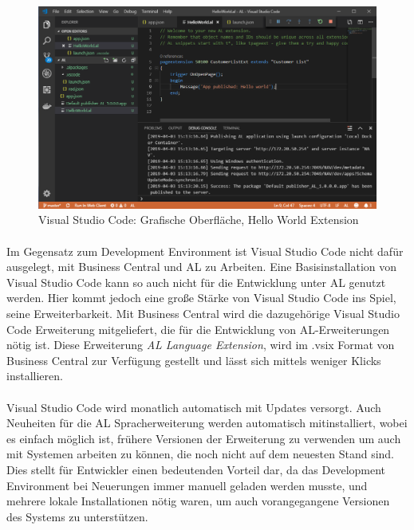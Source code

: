 \begin{figure}[h]
	\centering
	\includegraphics[width=130mm]{images/VSCode}
	\caption{Visual Studio Code: Grafische Oberfläche, Hello World Extension}
	\label{fig:VSCodeGUI}
\end{figure}

\pagebreak
\paragraph{}
Im Gegensatz zum Development Environment ist Visual Studio Code nicht dafür ausgelegt, mit Business Central und AL zu Arbeiten. Eine Basisinstallation von Visual Studio Code kann so auch nicht für die Entwicklung unter AL genutzt werden. Hier kommt jedoch eine große Stärke von Visual Studio Code ins Spiel, seine Erweiterbarkeit. Mit Business Central wird die dazugehörige Visual Studio Code Erweiterung mitgeliefert, die für die Entwicklung von AL-Erweiterungen nötig ist. Diese Erweiterung \textit{AL Language Extension}, wird im .vsix Format von Business Central zur Verfügung gestellt und lässt sich mittels weniger Klicks installieren.

\paragraph{}
Visual Studio Code wird monatlich automatisch mit Updates versorgt. Auch Neuheiten für die AL Spracherweiterung werden automatisch mitinstalliert, wobei es einfach möglich ist, frühere Versionen der Erweiterung zu verwenden um auch mit Systemen arbeiten zu können, die noch nicht auf dem neuesten Stand sind. Dies stellt für Entwickler einen bedeutenden Vorteil dar, da das Development Environment bei Neuerungen immer manuell geladen werden musste, und mehrere lokale Installationen nötig waren, um auch vorangegangene Versionen des Systems zu unterstützen.

